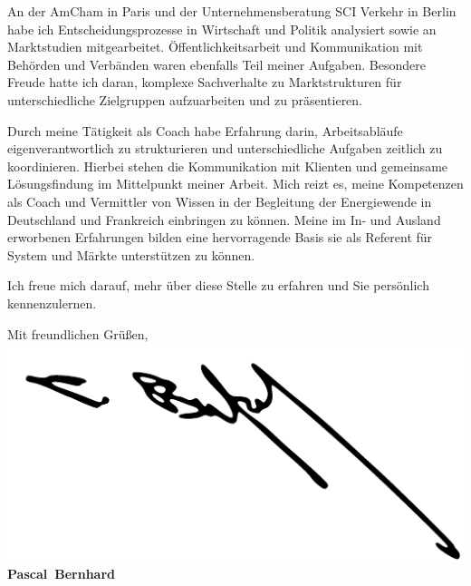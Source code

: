 \documentclass[11pt,a4paper]{article}
\def\firstname{Pascal}
\def\familyname{Bernhard}
\begin{document}
An der AmCham in Paris und der Unternehmensberatung SCI Verkehr in Berlin habe ich Entscheidungsprozesse in Wirtschaft und Politik analysiert sowie an Marktstudien mitgearbeitet. Öffentlichkeitsarbeit und Kommunikation mit Behörden und Verbänden waren ebenfalls Teil meiner Aufgaben. Besondere Freude hatte ich daran, komplexe Sachverhalte zu Marktstrukturen für unterschiedliche Zielgruppen aufzuarbeiten und zu präsentieren.

Durch meine Tätigkeit als Coach habe Erfahrung darin, Arbeitsabläufe eigenverantwortlich zu strukturieren und unterschiedliche Aufgaben zeitlich zu koordinieren. Hierbei stehen die Kommunikation mit Klienten und gemeinsame Lösungsfindung im Mittelpunkt meiner Arbeit. Mich reizt es, meine Kompetenzen als Coach und Vermittler von Wissen in der Begleitung der Energiewende in Deutschland und Frankreich einbringen zu können. Meine im In- und Ausland erworbenen Erfahrungen bilden eine hervorragende Basis sie als Referent für System und Märkte unterstützen zu können.

Ich freue mich darauf, mehr über diese Stelle zu erfahren und Sie persönlich kennenzulernen.

  
Mit freundlichen Grüßen,\\[2em] %
%
\includegraphics[scale=0.15]{Unterschrift.png}\\
{\bfseries \firstname~\familyname}\\
%
\end{document}
